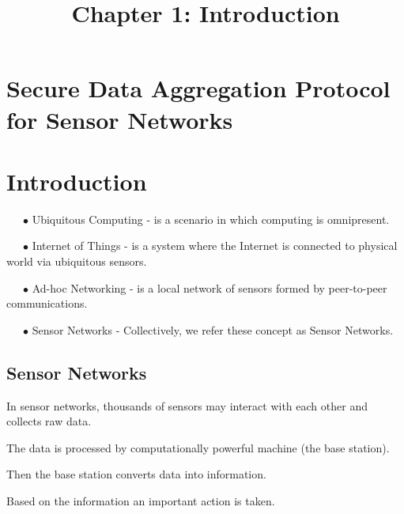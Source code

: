 \documentclass[%
  slidesonly,%
  semlayer%
  ]{xseminar}                                  %
\title{Chapter 1: Introduction}
\author{}
\date{}
\date{}
\newcommand{\mybul}{{\textcolor{white}{XX}}$\bullet$ }
\begin{document}


\maketitle          %

\begin{slide}
  \ifslidesonly              %
    \addtocounter{slide}{-1}
  \fi
\end{slide}


\begin{slide}

\footnotesize

\section*{Secure Data Aggregation Protocol for Sensor Networks}
  \clearpage

\section*{Introduction}
  \mybul Ubiquitous Computing - is a scenario in which computing is omnipresent.

  \mybul Internet of Things - is a system where the Internet is connected to physical world via ubiquitous sensors.
  
  \mybul Ad-hoc Networking - is a local network of sensors formed by peer-to-peer communications.
  
  \mybul Sensor Networks - Collectively, we refer these concept as Sensor Networks.
  
  \clearpage

  \subsection*{Sensor Networks}
    In sensor networks, thousands of sensors may interact with each other and collects raw data.

    The data is processed by computationally powerful machine (the base station).

    Then the base station converts data into information.

    Based on the information an important action is taken.


\end{slide}
\end{document}
